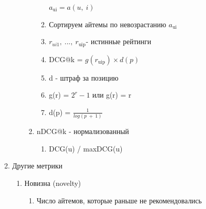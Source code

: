 \documentclass[a4paper, 12pt]{article}
\begin{document}
\begin{enumerate}
\begin{enumerate}
\begin{enumerate}
\begin{enumerate}
        \(a_{\text{ui}} = a(u,\ i)\)
        
      \item
        
        Сортируем айтемы по невозрастанию \(a_{\text{ui}}\)
        
      \item
        
        \(r_{ui1},\ ...,\ r_{\text{uip}}\)- истинные рейтинги
        
      \item
        
        DCG@k = \(g(r_{\text{uip}}) \times d(p)\)
        
      \item
        
        d - штраф за позицию
        
      \item
        
        g(r) = \(2^{r} - 1\) или g(r) = r
        
      \item
        
        d(p) = \(\frac{1}{log(p\  + \ 1)}\)
        
      \end{enumerate}
    \item
      
      nDCG@k - нормализованный
      

      \begin{enumerate}
      \def\labelenumiv{\arabic{enumiv}.}
      \item
        
        DCG(u) / maxDCG(u)
        
      \end{enumerate}
    \end{enumerate}
  \end{enumerate}
\item
  
  Другие метрики
  

  \begin{enumerate}
  \def\labelenumii{\alph{enumii}.}
  \item
    
    Новизна (novelty)
    

    \begin{enumerate}
    \def\labelenumiii{\roman{enumiii}.}
    \item
      
      Число айтемов, которые раньше не рекомендовались
      

\end{enumerate}
\end{enumerate}
\end{enumerate}
\end{document}
